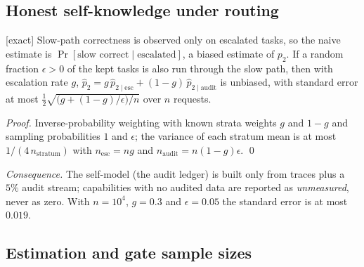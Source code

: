 \subsection{Honest self-knowledge under routing}

\begin{proposition}
\textnormal{[exact]}
\label{prop:audit}
Slow-path correctness is observed only on escalated tasks, so the naive
estimate is $\Pr[\text{slow correct}\mid\text{escalated}]$, a biased estimate of
$p_2$. If a random fraction $\epsilon>0$ of the kept tasks is also run through
the slow path, then with escalation rate $g$,
$\hat p_2=g\,\hat p_{2\mid\mathrm{esc}}+(1-g)\,\hat p_{2\mid\mathrm{audit}}$ is
unbiased, with standard error at most
$\tfrac{1}{2}\sqrt{\big(g+(1-g)/\epsilon\big)/n}$ over $n$ requests.
\end{proposition}
\begin{proof}
Inverse-probability weighting with known strata weights $g$ and $1-g$ and
sampling probabilities $1$ and $\epsilon$; the variance of each stratum mean is
at most $1/(4\,n_{\text{stratum}})$ with $n_{\text{esc}}=ng$ and
$n_{\text{audit}}=n(1-g)\epsilon$. \qed
\end{proof}
\emph{Consequence.} The self-model (the audit ledger) is built only
from traces plus a $5\%$ audit stream; capabilities with no audited
data are reported as \emph{unmeasured}, never as zero. With $n=10^4$, $g=0.3$
and $\epsilon=0.05$ the standard error is at most $0.019$.

\subsection{Estimation and gate sample sizes}

